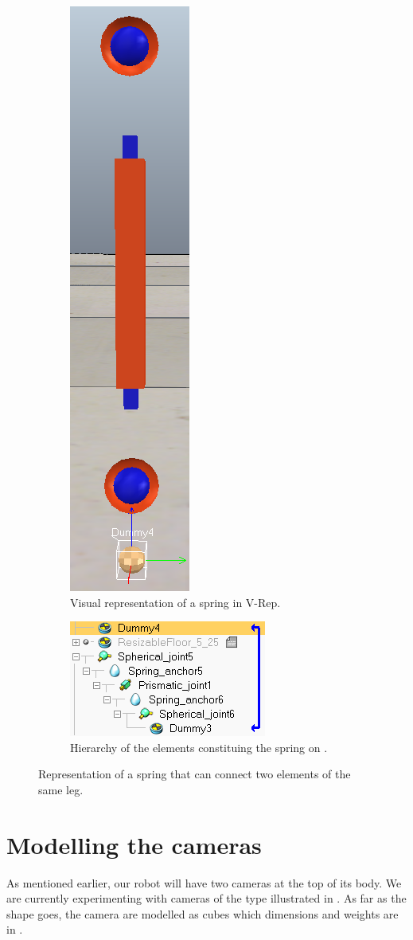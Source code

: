 \begin{figure}[htp]
\center
    \begin{subfigure}[b]{0.45\textwidth}
    \center
    \includegraphics[height = 0.5\textwidth]{figures/springs}
    \caption{Visual representation of a spring in V-Rep. \label{fig:spring1}}
    \end{subfigure}
    \hfill
    \begin{subfigure}[b]{0.45\textwidth}
    \center
    \includegraphics[height = 0.5\textwidth]{figures/springs_hierarchy}
    \caption{Hierarchy of the elements constituing the spring on . \label{fig:spring2}}
    \end{subfigure}
\caption[Modelling a spring]{Representation of a spring that can connect two elements of the same leg.}
\label{fig:springs}
\end{figure}

\section{Modelling the cameras}
As mentioned earlier, our robot will have two cameras at the top of its body. We are currently experimenting with cameras of the type illustrated in . As far as the shape goes, the camera are modelled as cubes which dimensions and weights are in .

